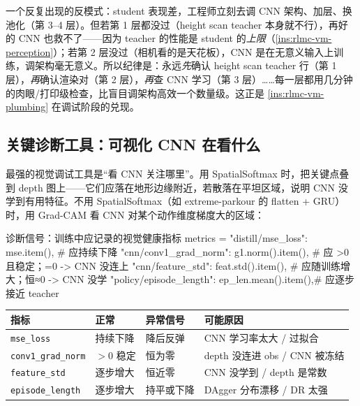 \begin{insight}[跳过前层直接查后层是视觉调试最大的时间浪费]\label{ins:rlmc-vm-fivelayer}
一个反复出现的反模式：student 表现差，工程师立刻去调 CNN 架构、加层、换池化（第 3--4 层）。但若第 1 层都没过（height scan teacher 本身就不行），再好的 CNN 也救不了——因为 teacher 的性能是 student 的\emph{上限}（\cref{ins:rlmc-vm-perception}）；若第 2 层没过（相机看的是天花板），CNN 是在无意义输入上训练，调架构毫无意义。所以纪律是：永远\emph{先}确认 height scan teacher 行（第 1 层），\emph{再}确认渲染对（第 2 层），\emph{再}查 CNN 学习（第 3 层）……每一层都用几分钟的肉眼/打印级检查，比盲目调架构高效一个数量级。这正是 \cref{ins:rlmc-vm-plumbing} 在调试阶段的兑现。
\end{insight}

\subsection{关键诊断工具：可视化 CNN 在看什么}
\label{sec:rlmc-vm-vizcnn}

最强的视觉调试工具是“看 CNN 关注哪里”。用 SpatialSoftmax 时，把关键点叠到 depth 图上——它们应落在地形边缘附近，若散落在平坦区域，说明 CNN 没学到有用特征。不用 SpatialSoftmax（如 extreme-parkour 的 flatten + GRU）时，用 Grad-CAM 看 CNN 对某个动作维度梯度大的区域：

\begin{codebox}[Python]{诊断信号：训练中应记录的视觉健康指标}
metrics = {
    "distill/mse_loss":      mse.item(),          # 应持续下降
    "cnn/conv1_grad_norm":   g1.norm().item(),    # 应 >0 且稳定；=0 -> CNN 没连上
    "cnn/feature_std":       feat.std().item(),   # 应随训练增大；恒≈0 -> CNN 没学
    "policy/episode_length": ep_len.mean().item(),# 应逐步接近 teacher
}
\end{codebox}

\begin{center}
\small
\begin{tabular}{@{}llll@{}}
\toprule
指标 & 正常 & 异常信号 & 可能原因 \\
\midrule
\verb|mse_loss| & 持续下降 & 降后反弹 & CNN 学习率太大 / 过拟合 \\
\verb|conv1_grad_norm| & $>0$ 稳定 & 恒为零 & depth 没连进 obs / CNN 被冻结 \\
\verb|feature_std| & 逐步增大 & 恒近零 & CNN 没学到 / depth 是常数 \\
\verb|episode_length| & 逐步增大 & 持平或下降 & DAgger 分布漂移 / DR 太强 \\
\bottomrule
\end{tabular}
\end{center}


